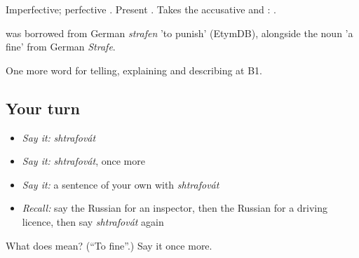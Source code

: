 Imperfective; perfective \emph{}. Present \emph{}. Takes the accusative and \emph{}: \emph{   }.

\begin{cousinweb}
\emph{} was borrowed from German \emph{strafen} 'to punish' (EtymDB), alongside the noun \emph{} 'a fine' from German \emph{Strafe}.
\end{cousinweb}

\begin{grammarlens}[title={What you've built}]
One more word for telling, explaining and describing at B1.
\end{grammarlens}

\subsection*{Your turn}
\begin{itemize}
\raggedright
  \item \emph{Say it:} \emph{shtrafovát}
  \item \emph{Say it:} \emph{shtrafovát}, once more
  \item \emph{Say it:} a sentence of your own with \emph{shtrafovát}
  \item \emph{Recall:} say the Russian for an inspector, then the Russian for a driving licence, then say \emph{shtrafovát} again
\end{itemize}

\begin{tcolorbox}[breakable,colback=teal!4,colframe=teal!35!black,title={Before you move on}]
What does  mean? (\textquotedblleft{}To fine\textquotedblright{}.) Say it once more.
\end{tcolorbox}
